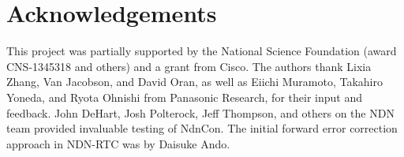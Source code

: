 \documentclass{icn/sig-alternate-2012} %
\newcommand{\ndnrtcName}{NDN-RTC} %
\newcommand{\ndnconName}{NdnCon}
\begin{document}
\section{Acknowledgements}
\label{sec:Acknowledgements}
This project was partially supported by the National Science Foundation (award CNS-1345318 and others) and a grant from Cisco. The authors thank Lixia Zhang, Van Jacobson, and David Oran, as well as Eiichi Muramoto, Takahiro Yoneda, and Ryota Ohnishi from Panasonic Research, for their input and feedback. John DeHart, Josh Polterock, Jeff Thompson, and others on the NDN team provided invaluable testing of \ndnconName{}.  The initial forward error correction approach in \ndnrtcName{} was by Daisuke Ando. 



\end{document}
